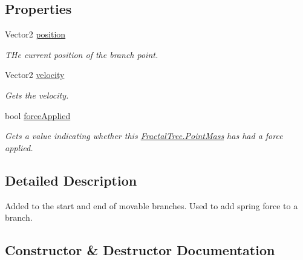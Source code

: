 \subsection*{Properties}
\begin{DoxyCompactItemize}
\item 
Vector2 \hyperlink{class_fractal_tree_1_1_point_mass_a388c55b55d073a8962d8c4e61ce4fd94}{position}
\begin{DoxyCompactList}\small\item\em T\+He current position of the branch point. \end{DoxyCompactList}\item 
Vector2 \hyperlink{class_fractal_tree_1_1_point_mass_a1cbd0cc0eacfadb549cbc5fdb87ccbb1}{velocity}
\begin{DoxyCompactList}\small\item\em Gets the velocity. \end{DoxyCompactList}\item 
bool \hyperlink{class_fractal_tree_1_1_point_mass_a25ea2ddc370c2cf21b7f376bd8bb2cf6}{force\+Applied}
\begin{DoxyCompactList}\small\item\em Gets a value indicating whether this \hyperlink{class_fractal_tree_1_1_point_mass}{Fractal\+Tree.\+Point\+Mass} has had a force applied. \end{DoxyCompactList}\end{DoxyCompactItemize}


\subsection{Detailed Description}
Added to the start and end of movable branches. Used to add spring force to a branch. 



\subsection{Constructor \& Destructor Documentation}
\hypertarget{class_fractal_tree_1_1_point_mass_aeae7254d48ee357290cc926783f76232}{}\label{class_fractal_tree_1_1_point_mass_aeae7254d48ee357290cc926783f76232} 
